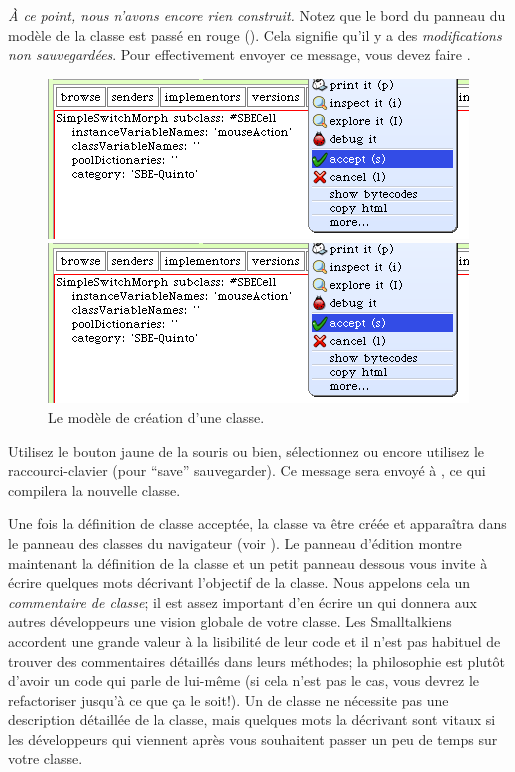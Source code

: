 \documentclass[a4paper,10pt,twoside]{book}
\begin{document}
\emph{À ce point, nous n'avons encore rien construit.}
Notez que le bord du panneau du modèle de la classe est passé en rouge ().
Cela signifie qu'il y a des \emph{modifications non sauvegardées}.
Pour effectivement envoyer ce message, vous devez faire .

\begin{figure}[h!t]
\ifluluelse
	{\centerline {\includegraphics[width=\textwidth]{AcceptClassDef}}}
	{\centerline {\includegraphics[scale=0.7]{AcceptClassDef}}}
\caption{Le modèle de création d'une classe.
\label{fig:acceptClassDef}}
\end{figure}

Utilisez le bouton jaune de la souris ou bien, sélectionnez
 ou encore utilisez le raccourci-clavier  (pour
``save'' 
\cad sauvegarder).
Ce message sera envoyé à , ce qui compilera la nouvelle classe.

Une fois la définition de classe acceptée, la classe va être créée et
apparaîtra dans le panneau des classes du navigateur (voir ).
Le panneau d'édition montre maintenant la définition de la classe et
un petit panneau dessous vous invite à écrire quelques mots décrivant
l'objectif de la classe. Nous appelons cela un \emph{commentaire de
  classe}; il est assez important d'en écrire un qui donnera aux
autres développeurs une vision 
globale de votre classe.
Les Smalltalkiens accordent une grande valeur à la lisibilité de leur
code et il n'est pas habituel de trouver des commentaires détaillés
dans leurs méthodes; la philosophie est plutôt d'avoir un code qui
parle de lui-même (si cela n'est pas le cas, vous devrez le
refactoriser jusqu'à ce que \c{c}a le soit!). 
Un  de classe ne nécessite pas une
description détaillée de la classe, mais quelques mots la décrivant
sont vitaux si les développeurs qui viennent après vous souhaitent
passer un peu de temps sur votre classe.
\end{document}

